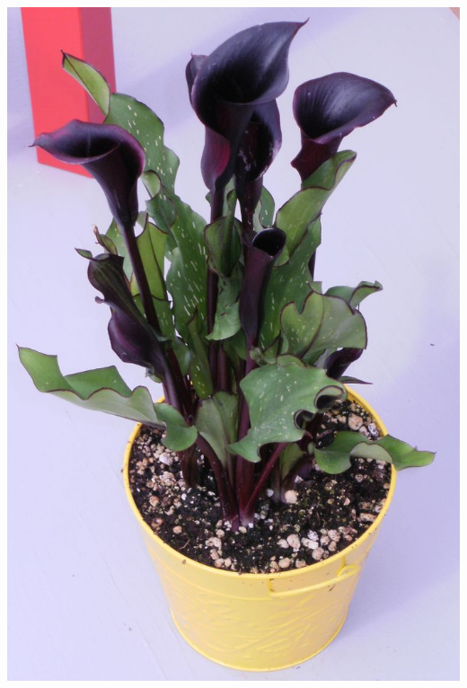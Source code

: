 \documentclass{article}
\begin{document}
\begin{center}
\includegraphics[height=0.9\textheight, angle=90]{../CallaLily_black.jpg}
\end{center}
\newpage
\end{document}
